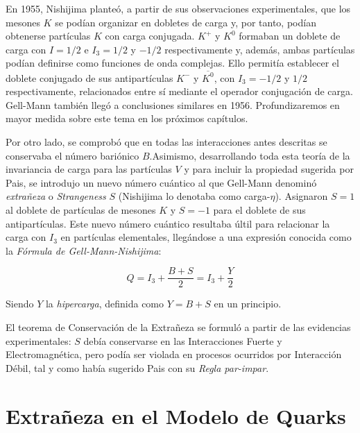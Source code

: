 En 1955, Nishijima planteó, a partir de sus observaciones experimentales, que los mesones $K$ se podían organizar en dobletes de carga y, por tanto, podían obtenerse partículas $K$ con carga conjugada. $K^+$ y $K^0$ formaban un doblete de carga con $I=1/2$ e $I_3=1/2$ y $-1/2$ respectivamente y, además, ambas partículas podían definirse como funciones de onda complejas. Ello permitía establecer el doblete conjugado de sus antipartículas $K^-$ y $\overline{K^0}$, con $I_3=-1/2$ y $1/2$ respectivamente, relacionados entre sí mediante el operador conjugación de carga. Gell-Mann también llegó a conclusiones similares en 1956. Profundizaremos en mayor medida sobre este tema en los próximos capítulos. \cite{Nishijima1955}

Por otro lado, se comprobó que en todas las interacciones antes descritas se conservaba el número bariónico $B$.\protect\footnotemark    Asimismo, desarrollando toda esta teoría de la invariancia de carga para las partículas $V$ y para incluir la propiedad sugerida por Pais, se introdujo un nuevo número cuántico al que Gell-Mann denominó \textit{extrañeza} o \textit{Strangeness} $S$ (Nishijima lo denotaba como carga-$\eta$). Asignaron $S=1$ al doblete de partículas de mesones $K$ y $S=-1$ para el doblete de sus antipartículas. Este nuevo número cuántico resultaba últil para relacionar la carga con $I_3$ en partículas elementales, llegándose a una expresión conocida como la \textit{Fórmula de Gell-Mann-Nishijima}:


\begin{equation}
Q=I_3+ \frac{B+S}{2}=I_3+\frac{Y}{2}
\end{equation}

Siendo $Y$ la \textit{hipercarga}, definida como $Y=B+S$ en un principio.

El teorema de Conservación de la Extrañeza se formuló a partir de las evidencias experimentales: $S$ debía conservarse en las Interacciones Fuerte y Electromagnética, pero podía ser violada en procesos ocurridos por Interacción Débil, tal y como había sugerido Pais con su \textit{Regla par-impar}.\\


\section{Extrañeza en el Modelo de Quarks}\label{cap:strangeness_quark_model}
\vspace{5mm}

